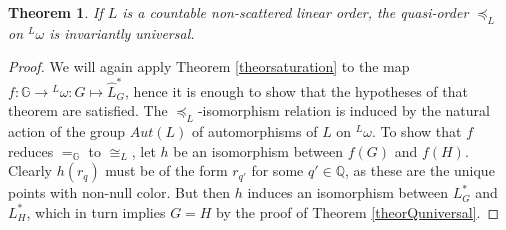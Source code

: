 \documentclass{amsart}
\newtheorem{theorem}{Theorem}[section]
\theoremstyle{definition}
\theoremstyle{remark}
\begin{document}
\begin{theorem} \label{theornonscattered}
If $L$ is a countable non-scattered linear order, the quasi-order $\preceq_L$ on ${}^L \omega$ is invariantly universal.
\end{theorem}

\begin{proof}
We will again apply Theorem \ref{theorsaturation} to the map $f \colon
{\mathbb{G}} \to {}^L \omega \colon G
\mapsto \hat{L}_G^*$, hence it is enough to show that the
hypotheses of that theorem are satisfied. The $\preceq_L$-isomorphism relation
is induced by the natural
action of the group $Aut(L)$ of automorphisms of $L$ on ${}^L
\omega$. To show that $f$ reduces $=_{\mathbb{G}}$ to $\cong_L$, let $h$ be an isomorphism
between $f(G)$ and $f(H)$. Clearly $h(r_q)$ must be of the form
$r_{q'}$ for some $q' \in {\mathbb{Q}}$, as these are the unique points with
non-null color. But then $h$ induces an isomorphism between
$L^*_G$ and $L^*_H$, which in turn implies $G = H$ by the
proof of Theorem \ref{theorQuniversal}.


\end{proof}
\end{document}

